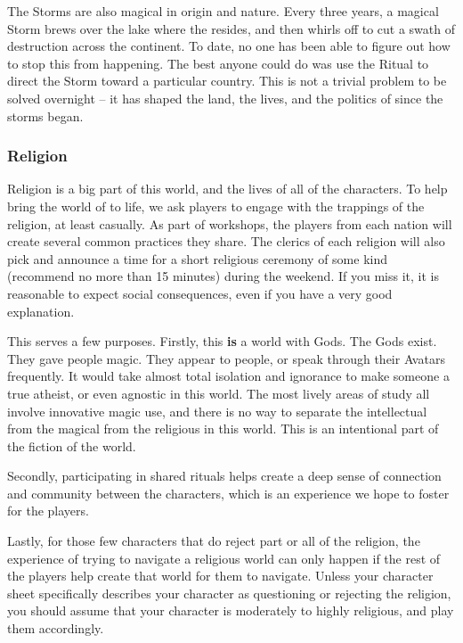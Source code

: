 \documentclass[sheet]{GL2020}
\begin{document}
The Storms are also magical in origin and nature. Every three years, a magical Storm brews over the lake where the \pSc{} resides, and then whirls off to cut a swath of destruction across the continent. To date, no one has been able to figure out how to stop this from happening. The best anyone could do was use the Ritual to direct the Storm toward a particular country. This is not a trivial problem to be solved overnight -- it has shaped the land, the lives, and the politics of \pEarth{} since the storms began.

\subsubsection{Religion}
Religion is a big part of this world, and the lives of all of the characters. To help bring the world of \pEarth{} to life, we ask players to engage with the trappings of the religion, at least casually. As part of workshops, the players from each nation will create several common practices they share. The clerics of each religion will also pick and announce a time for a short religious ceremony of some kind (recommend no more than 15 minutes) during the weekend. If you miss it, it is reasonable to expect social consequences, even if you have a very good explanation.

This serves a few purposes. Firstly, this \textbf{is} a world with Gods. The Gods exist. They gave people magic. They appear to people, or speak through their Avatars frequently. It would take almost total isolation and ignorance to make someone a true atheist, or even agnostic in this world. The most lively areas of study all involve innovative magic use, and there is no way to separate the intellectual from the magical from the religious in this world. This is an intentional part of the fiction of the world. 

Secondly, participating in shared rituals helps create a deep sense of connection and community between the characters, which is an experience we hope to foster for the players. 

Lastly, for those few characters that do reject part or all of the religion, the experience of trying to navigate a religious world can only happen if the rest of the players help create that world for them to navigate. Unless your character sheet specifically describes your character as questioning or rejecting the religion, you should assume that your character is moderately to highly religious, and play them accordingly. 
\end{document}
